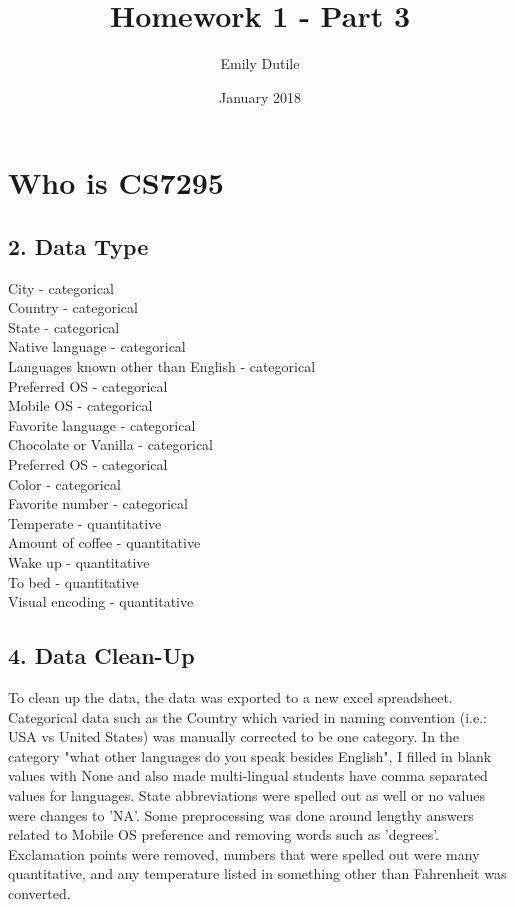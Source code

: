 \documentclass{neu_handout}
\title{Homework 1 - Part 3}
\author{Emily Dutile}
\date{January 2018}
\begin{document}
\section*{Who is CS7295}

\subsection*{2. Data Type}

City - categorical \\
Country - categorical \\ 
State - categorical \\
Native language - categorical \\
Languages known other than English - categorical \\
Preferred OS - categorical \\
Mobile OS - categorical \\
Favorite language - categorical \\
Chocolate or Vanilla - categorical \\
Preferred OS - categorical \\
Color - categorical \\
Favorite number - categorical \\
Temperate - quantitative \\
Amount of coffee - quantitative \\
Wake up - quantitative \\
To bed - quantitative \\
Visual encoding - quantitative

\subsection*{4. Data Clean-Up}
To clean up the data, the data was exported to a new excel spreadsheet. Categorical data such as the Country which varied in naming convention (i.e.: USA vs United States) was manually corrected to be one category. In the category "what other languages do you speak besides English", I filled in blank values with None and also made multi-lingual students have comma separated values for languages. State abbreviations were spelled out as well or no values were changes to 'NA'. Some preprocessing was done around lengthy answers related to Mobile OS preference and removing words such as 'degrees'. Exclamation points were removed, numbers that were spelled out were many quantitative, and any temperature listed in something other than Fahrenheit was converted.
\end{document}
